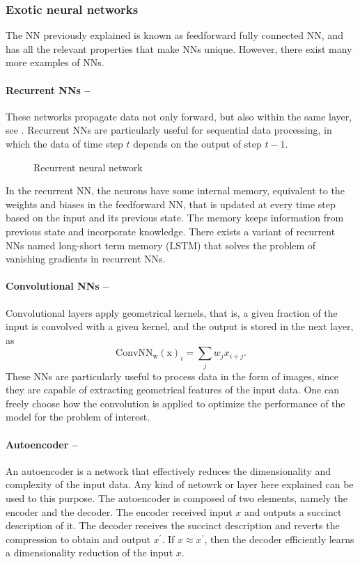\documentclass[]{report}
\begin{document}
\subsubsection{Exotic neural networks}

The NN previously explained is known as feedforward fully connected NN, and has all the relevant properties that make NNs unique. However, there exist many more examples of NNs. 

\paragraph{Recurrent NNs --} These networks propagate data not only forward, but also within the same layer, see . Recurrent NNs are particularly useful for sequential data processing, in which the data of time step $t$ depends on the output of step $t - 1$. 

\begin{figure}
\caption{Recurrent neural network}
\label{fig.recurrent-network}
\end{figure}

In the recurrent NN, the neurons have some internal memory, equivalent to the weights and biases in the feedforward NN, that is updated at every time step based on the input and its previous state. The memory keeps information from previous state and incorporate knowledge. There exists a variant of recurrent NNs named long-short term memory (LSTM) that solves the problem of vanishing gradients in recurrent NNs. 


\paragraph{Convolutional NNs --} Convolutional layers apply geometrical kernels, that is, a given fraction of the input is convolved with a given kernel, and the output is stored in the next layer, as
\begin{equation}
\operatorname{ConvNN_w(x)}_i = \sum_{j} w_j x_{i + j}.
\end{equation}
These NNs are particularly useful to process data in the form of images, since they are capable of extracting geometrical features of the input data. One can freely choose how the convolution is applied to optimize the performance of the model for the problem of interest. 

\paragraph{Autoencoder --}An autoencoder is a network that effectively reduces the dimensionality and complexity of the input data. Any kind of netowrk or layer here explained can be used to this purpose. The autoencoder is composed of two elements, namely the encoder and the decoder. The encoder received input $x$ and outputs a succinct description of it. The decoder receives the succinct description and reverts the compression to obtain and output $x^\prime$. If $x \approx x^\prime$, then the decoder efficiently learns a dimensionality reduction of the input $x$. 
\end{document}
